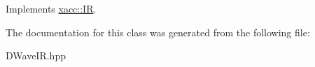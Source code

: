 Implements \hyperlink{a00041_a8356cdff1919b88eabeb84fd7450cdb6}{xacc\+::\+IR}.



The documentation for this class was generated from the following file\+:\begin{DoxyCompactItemize}
\item 
D\+Wave\+I\+R.\+hpp\end{DoxyCompactItemize}
